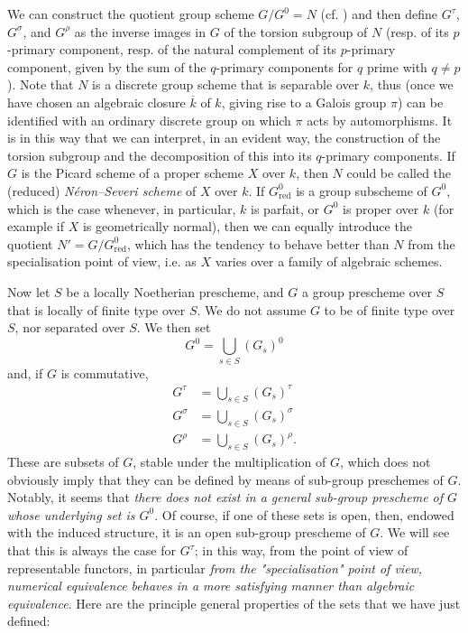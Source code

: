 \begin{remark}\label{fga3.vi-1-remark}
    We can construct the quotient group scheme $G/G^0=N$ (cf. ) and then define $G^\tau$, $G^\sigma$, and $G^\rho$ as the inverse images in $G$ of the torsion subgroup of $N$ (resp. of its $p$-primary component, resp. of the natural complement of its $p$-primary component, given by the sum of the $q$-primary components for $q$ prime with $q\neq p$).
    Note that $N$ is a discrete group scheme that is separable over $k$, thus (once we have chosen an algebraic closure $\overline{k}$ of $k$, giving rise to a Galois group $\pi$) can be identified with an ordinary discrete group on which $\pi$ acts by automorphisms.
    It is in this way that we can interpret, in an evident way, the construction of the torsion subgroup and the decomposition of this into its $q$-primary components.
    If $G$ is the Picard scheme of a proper scheme $X$ over $k$, then $N$ could be called the (reduced) \emph{Néron–Severi scheme} of $X$ over $k$.
    If $G_\mathrm{red}^0$ is a group subscheme of $G^0$, which is the case whenever, in particular, $k$ is parfait, or $G^0$ is proper over $k$ (for example if $X$ is geometrically normal), then we can equally introduce the quotient $N'=G/G_\mathrm{red}^0$, which has the tendency to behave better than $N$ from the specialisation point of view, i.e. as $X$ varies over a family of algebraic schemes.
\end{remark}

Now let $S$ be a locally Noetherian prescheme, and $G$ a group prescheme over $S$ that is locally of finite type over $S$.
We do not assume $G$ to be of finite type over $S$, nor separated over $S$.
We then set
\[
    G^0 = \bigcup_{s\in S} (G_s)^0
\]
and, if $G$ is commutative,
\[
    \begin{aligned}
        G^\tau   & = \bigcup_{s\in S} (G_s)^\tau   \\
        G^\sigma & = \bigcup_{s\in S} (G_s)^\sigma \\
        G^\rho   & = \bigcup_{s\in S} (G_s)^\rho.
    \end{aligned}
\]
These are subsets of $G$, stable under the multiplication of $G$, which does not obviously imply that they can be defined by means of sub-group preschemes of $G$.
Notably, it seems that \emph{there does not exist in a general sub-group prescheme of $G$ whose underlying set is $G^0$}.
Of course, if one of these sets is open, then, endowed with the induced structure, it is an open sub-group prescheme of $G$.
We will see that this is always the case for $G^\tau$;
in this way, from the point of view of representable functors, in particular \emph{from the "specialisation" point of view, numerical equivalence behaves in a more satisfying manner than algebraic equivalence}.
Here are the principle general properties of the sets that we have just defined:

